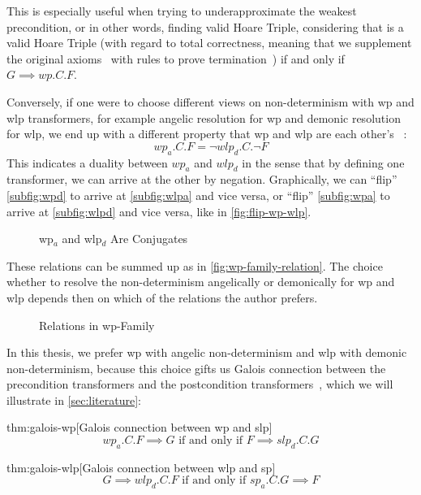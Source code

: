 This is especially useful when trying to underapproximate the weakest precondition, %
or in other words, finding valid Hoare Triple, considering that  is a valid Hoare Triple (with regard to total correctness, meaning that we supplement the original axioms~\cite{hoare69} with rules to prove termination~\cite{manna74}) if and only if $G\implies wp.C.F$.

Conversely, if one were to choose different views on non-determinism with wp and wlp transformers, for example angelic resolution for wp and demonic resolution for wlp, we end up with a different property that wp and wlp are each other's ~\cite{dijkstra76,zhang22}: 
$$ wp_a.C.F = \neg wlp_d.C.\neg F $$ 
This indicates a duality between $wp_a$ and $wlp_d$ in the sense that by defining one transformer, we can arrive at the other by negation. 
Graphically, we can ``flip'' \autoref{subfig:wpd} to arrive at \autoref{subfig:wlpa} and vice versa, or ``flip'' \autoref{subfig:wpa} to arrive at \autoref{subfig:wlpd} and vice versa, like in \autoref{fig:flip-wp-wlp}. 
\begin{figure}[ht]
	\centering
	
	\caption{wp$_a$ and wlp$_d$ Are Conjugates}
	\label{fig:flip-wp-wlp}
\end{figure}

These relations can be summed up as in \autoref{fig:wp-family-relation}. 
The choice whether to resolve the non-determinism angelically or demonically for wp and wlp depends then on which of the relations the author prefers. 
\begin{figure}[ht]
	\centering
	
	\caption{Relations in wp-Family}
	\label{fig:wp-family-relation}
\end{figure}

In this thesis, we prefer wp with angelic non-determinism and wlp with demonic non-determinism, because this choice gifts us Galois connection between the precondition transformers and the postcondition transformers~\cite{zhang22}, which we will illustrate in \autoref{sec:literature}: 
\begin{theorem}{thm:galois-wp}[Galois connection between wp and slp]
	$$wp_a.C.F \implies G \text{ if and only if }F\implies slp_d.C.G$$
\end{theorem}

\begin{theorem}{thm:galois-wlp}[Galois connection between wlp and sp]
	$$G \implies wlp_d.C.F \text{ if and only if } sp_a.C.G\implies F$$
\end{theorem}

